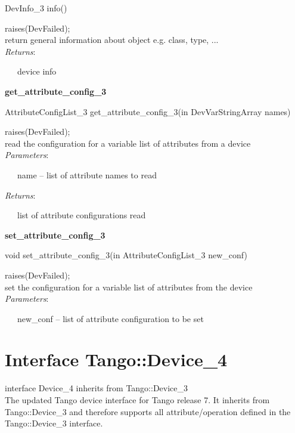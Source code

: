 DevInfo\_3 info()

raises(DevFailed);\\

return general information about object e.g. class, type, ...\\

\emph{Returns}:

~~~device info\\

\begin{flushleft}
\textbf{get\_attribute\_config\_3}
\par\end{flushleft}

AttributeConfigList\_3 get\_attribute\_config\_3(in DevVarStringArray
names)

raises(DevFailed);\\

read the configuration for a variable list of attributes from a device\\

\emph{Parameters}:

~~~name – list of attribute names to read

\emph{Returns}:

~~~list of attribute configurations read\\

\begin{flushleft}
\textbf{set\_attribute\_config\_3}
\par\end{flushleft}

void set\_attribute\_config\_3(in AttributeConfigList\_3 new\_conf)

raises(DevFailed);\\

set the configuration for a variable list of attributes from the device\\

\emph{Parameters}:

~~~new\_conf – list of attribute configuration to be set\\


\section{Interface Tango::Device\_4}

interface Device\_4 inherits from Tango::Device\_3\\

The updated Tango device interface for Tango release 7. It inherits
from Tango::Device\_3 and therefore supports all attribute/operation
defined in the Tango::Device\_3 interface.

